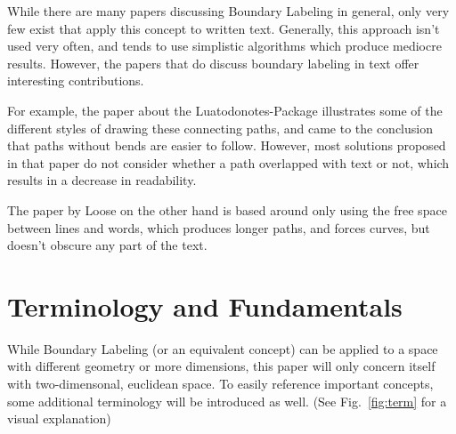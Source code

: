 \documentclass[11pt,a4paper]{vutinfth}
\begin{document}
While there are many papers discussing Boundary Labeling in general, only very few exist that apply this concept to written text. Generally, this approach isn't used very often, and tends to use simplistic algorithms which produce mediocre results. %
However, the papers that do discuss boundary labeling in text offer interesting contributions.

For example, the paper about the Luatodonotes-Package\cite{Kindermann2014} illustrates some of the different styles of drawing these connecting paths, and came to the conclusion that paths without bends are easier to follow. %
However, most solutions proposed in that paper do not consider whether a path overlapped with text or not, which results in a decrease in readability.

The paper by Loose\cite{Loose2015} on the other hand is based around only using the free space between lines and words, which produces longer paths, and forces curves, but doesn't obscure any part of the text.



\section{Terminology and Fundamentals} %
While Boundary Labeling (or an equivalent concept) can be applied to a space with different geometry or more dimensions, this paper will only concern itself with two-dimensonal, euclidean space.
To easily reference important concepts, some additional terminology will be introduced as well. (See Fig.~\ref{fig:term} for a visual explanation)%

\end{document}
